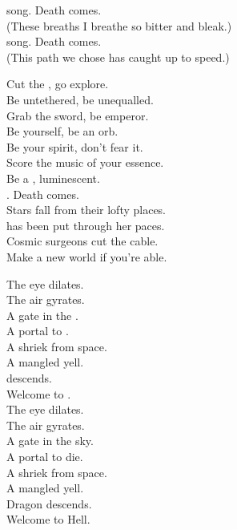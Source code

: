  song. Death comes. \\
(These breaths I breathe so bitter and bleak.) \\
 song. Death comes. \\
(This path we chose has caught up to speed.) \\


Cut the , go explore. \\
Be untethered, be unequalled. \\
Grab the sword, be emperor. \\
Be yourself, be an orb. \\
Be your spirit, don't fear it. \\
Score the music of your essence. \\
Be a , luminescent. \\
. Death comes. \\

Stars fall from their lofty places. \\
 has been put through her paces. \\
Cosmic surgeons cut the cable. \\
Make a new world if you're able. \\


The eye dilates. \\
The air gyrates. \\
A gate in the . \\
A portal to . \\
A shriek from space. \\
A mangled yell. \\
 descends. \\
Welcome to . \\

The eye dilates. \\
The air gyrates. \\
A gate in the sky. \\
A portal to die. \\
A shriek from space. \\
A mangled yell. \\
Dragon descends. \\
Welcome to Hell. \\


